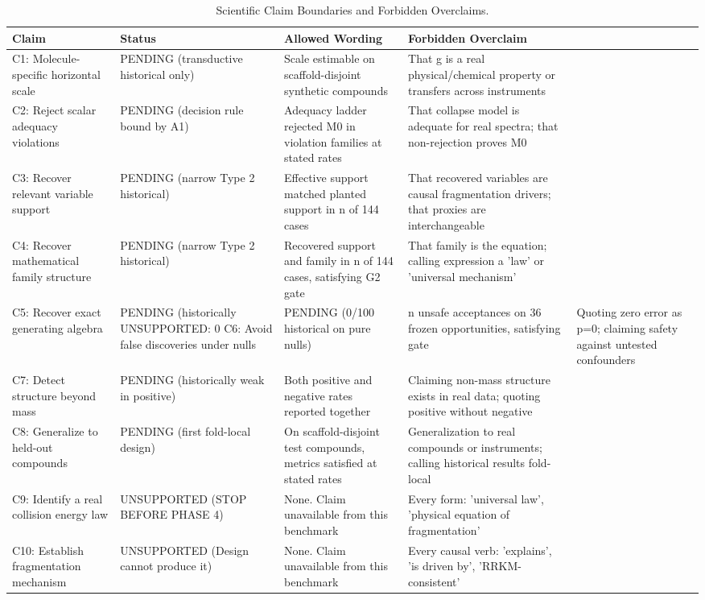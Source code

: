 \begin{table}[t]
\centering
\small
\caption{Scientific Claim Boundaries and Forbidden Overclaims.}
\label{tab:claim_boundaries}
\begin{tabular}{llll}
\toprule
Claim & Status & Allowed Wording & Forbidden Overclaim \\
\midrule
C1: Molecule-specific horizontal scale & PENDING (transductive historical only) & Scale estimable on scaffold-disjoint synthetic compounds & That g is a real physical/chemical property or transfers across instruments \\
C2: Reject scalar adequacy violations & PENDING (decision rule bound by A1) & Adequacy ladder rejected M0 in violation families at stated rates & That collapse model is adequate for real spectra; that non-rejection proves M0 \\
C3: Recover relevant variable support & PENDING (narrow Type 2 historical) & Effective support matched planted support in n of 144 cases & That recovered variables are causal fragmentation drivers; that proxies are interchangeable \\
C4: Recover mathematical family structure & PENDING (narrow Type 2 historical) & Recovered support and family in n of 144 cases, satisfying G2 gate & That family is the equation; calling expression a 'law' or 'universal mechanism' \\
C5: Recover exact generating algebra & PENDING (historically UNSUPPORTED: 0%
C6: Avoid false discoveries under nulls & PENDING (0/100 historical on pure nulls) & n unsafe acceptances on 36 frozen opportunities, satisfying gate & Quoting zero error as p=0; claiming safety against untested confounders \\
C7: Detect structure beyond mass & PENDING (historically weak in positive) & Both positive and negative rates reported together & Claiming non-mass structure exists in real data; quoting positive without negative \\
C8: Generalize to held-out compounds & PENDING (first fold-local design) & On scaffold-disjoint test compounds, metrics satisfied at stated rates & Generalization to real compounds or instruments; calling historical results fold-local \\
C9: Identify a real collision energy law & UNSUPPORTED (STOP BEFORE PHASE 4) & None. Claim unavailable from this benchmark & Every form: 'universal law', 'physical equation of fragmentation' \\
C10: Establish fragmentation mechanism & UNSUPPORTED (Design cannot produce it) & None. Claim unavailable from this benchmark & Every causal verb: 'explains', 'is driven by', 'RRKM-consistent' \\
\bottomrule
\end{tabular}
\end{table}
